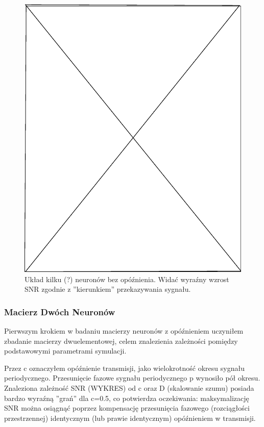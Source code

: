   \begin{figure}
    \includegraphics[width=120mm]{images/pending}
    \caption{Układ kilku (?) neuronów bez opóźnienia. Widać wyraźny wzrost SNR zgodnie z ''kierunkiem'' przekazywania sygnału.}
    \label{fig:graphics:sim:xx}
  \end{figure}
  
  
  \subsubsection{Macierz Dwóch Neuronów}

  Pierwszym krokiem w badaniu macierzy neuronów z opóźnieniem uczyniłem zbadanie macierzy dwuelementowej, celem znalezienia zależności pomiędzy podstawowymi parametrami symulacji.

  Przez c oznaczyłem opóźnienie transmisji, jako wielokrotność okresu sygnału periodycznego. Przesunięcie fazowe sygnału periodycznego p wynosiło pół okresu.
  Znaleziona zależność SNR (WYKRES) od c oraz D (skalowanie szumu) posiada bardzo wyraźną ''grań'' dla c=0.5, co potwierdza oczekiwania: maksymalizację SNR można osiągnąć poprzez kompensację przesunięcia fazowego (rozciągłości przestrzennej) identycznym (lub prawie identycznym) opóźnieniem w transmisji.

